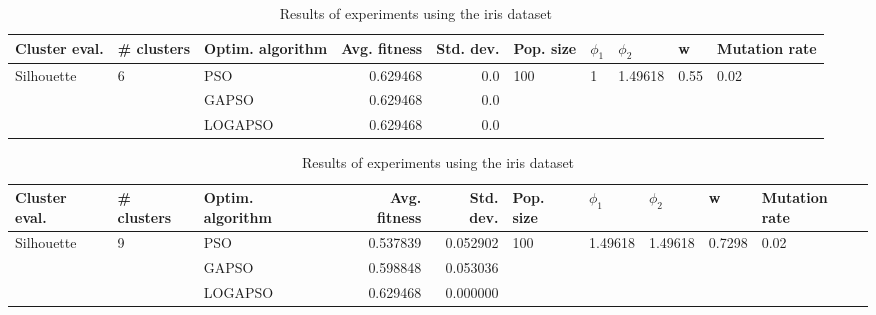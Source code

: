 \documentclass{article}
\begin{document}
\begin{table}
\centering
\caption{Results of experiments using the iris dataset}
\begin{tabular}{lllrrlllll}
\toprule
              Cluster eval. &        \# clusters & Optim. algorithm &  Avg. fitness &  Std. dev. &            Pop. size &         $\phi_{1}$ &               $\phi_{2}$ &                     w &         Mutation rate \\
\midrule
\multirow{3}{*}{Silhouette} & \multirow{3}{*}{6} &              PSO &      0.629468 &        0.0 & \multirow{3}{*}{100} & \multirow{3}{*}{1} & \multirow{3}{*}{1.49618} & \multirow{3}{*}{0.55} & \multirow{3}{*}{0.02} \\
                            &                    &            GAPSO &      0.629468 &        0.0 &                      &                    &                          &                       &                       \\
                            &                    &          LOGAPSO &      0.629468 &        0.0 &                      &                    &                          &                       &                       \\
\bottomrule
\end{tabular}
\end{table}
\begin{table}
\centering
\caption{Results of experiments using the iris dataset}
\begin{tabular}{lllrrlllll}
\toprule
              Cluster eval. &        \# clusters & Optim. algorithm &  Avg. fitness &  Std. dev. &            Pop. size &               $\phi_{1}$ &               $\phi_{2}$ &                       w &         Mutation rate \\
\midrule
\multirow{3}{*}{Silhouette} & \multirow{3}{*}{9} &              PSO &      0.537839 &   0.052902 & \multirow{3}{*}{100} & \multirow{3}{*}{1.49618} & \multirow{3}{*}{1.49618} & \multirow{3}{*}{0.7298} & \multirow{3}{*}{0.02} \\
                            &                    &            GAPSO &      0.598848 &   0.053036 &                      &                          &                          &                         &                       \\
                            &                    &          LOGAPSO &      0.629468 &   0.000000 &                      &                          &                          &                         &                       \\
\bottomrule
\end{tabular}
\end{table}
\end{document}
